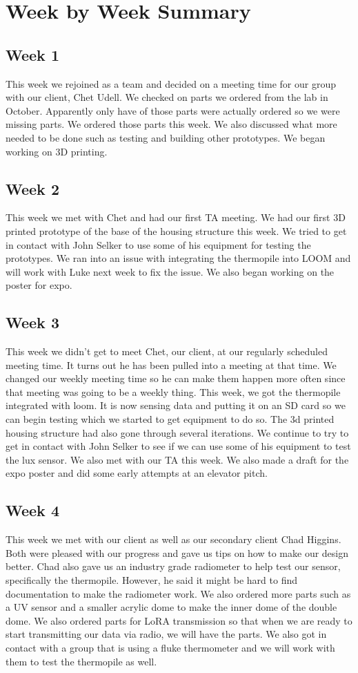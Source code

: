 \documentclass[10pt,draftclsnofoot,onecolumn,letterpaper]{article}
\begin{document}
\section{Week by Week Summary}
\subsection{Week 1}
This week we rejoined as a team and decided on a meeting time for our group with our client, Chet Udell. We checked on parts we ordered from the lab in October. Apparently only have of those parts were actually ordered so we were missing parts. We ordered those parts this week. We also discussed what more needed to be done such as testing and building other prototypes. We began working on 3D printing.

\subsection{Week 2}
This week we met with Chet and had our first TA meeting. We had our first 3D printed prototype of the base of the housing structure this week. We tried to get in contact with John Selker to use some of his equipment for testing the prototypes. We ran into an issue with integrating the thermopile into LOOM and will work with Luke next week to fix the issue. We also began working on the poster for expo. 
 
\subsection{Week 3}
This week we didn't get to meet Chet, our client, at our regularly scheduled meeting time. It turns out he has been pulled into a meeting at that time. We changed our weekly meeting time so he can make them happen more often since that meeting was going to be a weekly thing. This week, we got the thermopile integrated with loom. It is now sensing data and putting it on an SD card so we can begin testing which we started to get equipment to do so. The 3d printed housing structure had also gone through several iterations. We continue to try to get in contact with John Selker to see if we can use some of his equipment to test the lux sensor. We also met with our TA this week. We also made a draft for the expo poster and did some early attempts at an elevator pitch.

\subsection{Week 4}
This week we met with our client as well as our secondary client Chad Higgins. Both were pleased with our progress and gave us tips on how to make our design better. Chad also gave us an industry grade radiometer to help test our sensor, specifically the thermopile. However, he said it might be hard to find documentation to make the radiometer work. We also ordered more parts such as a UV sensor and a smaller acrylic dome to make the inner dome of the double dome. We also ordered parts for LoRA transmission so that when we are ready to start transmitting our data via radio, we will have the parts. We also got in contact with a group that is using a fluke thermometer and we will work with them to test the thermopile as well. 
\end{document}
